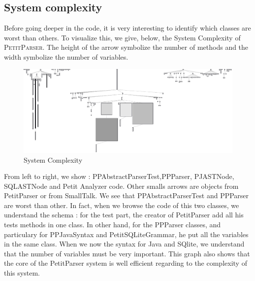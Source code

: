 \subsection{System complexity}
Before going deeper in the code, it is very interesting to identify which classes are worst than others.  To visualize this, we give, below, the System Complexity of \textsc{PetitParser}.
The height of the arrow symbolize the number of methods and the width symbolize the number of variables.
\begin{figure}[ht]
\label{system_complexity}
\includegraphics[scale=0.35]{system_complexity.png}
\caption{System Complexity}
\end{figure}
From left to right, we show : PPAbstractParserTest,PPParser, PJASTNode, SQLASTNode and Petit Analyzer code.  Other smalls arrows are objects from PetitParser or from SmallTalk.
We see that PPAbstractParserTest and PPParser are worst than other.  In fact, when we browse the code of this two classes, we understand the schema : for the test part, the creator of PetitParser add all his tests methods in one class.  In other hand, for the PPParser classes, and particulary for PPJavaSyntax and PetitSQLiteGrammar, he put all the variables in the same class.  When we now the syntax for Java and SQlite, we understand that the number of variables must be very important.
This graph also shows that the core of the PetitParser system is well efficient regarding to the complexity of this system.

